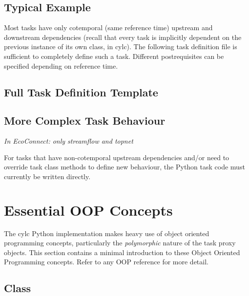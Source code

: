 \documentclass[11pt,a4paper]{article}
\begin{document}
\subsection{Typical Example}

Most tasks have only cotemporal (same reference time) upstream and
downstream dependencies (recall that every task is implicitly dependent
on the previous instance of its own class, in cylc). The following
task definition file is sufficient to completely define such a task.
Different postrequisites can be specified depending on reference time. 

\lstset{language=bash, numbers=left}

{
\color{Magenta}

}

\subsection{Full Task Definition Template}

\lstset{language=sh, numbers=left}

{
\color{Magenta}

}

\subsection{More Complex Task Behaviour}

\textit{In EcoConnect: only streamflow and topnet}

For tasks that have non-cotemporal upstream dependencies and/or need to  
override task class methods to define new behaviour, the Python task
code must currently be written directly. 



\appendix

\section{Essential OOP Concepts}

The cylc Python implementation makes heavy use of object oriented
programming concepts, particularly the {\em polymorphic} nature of
the task proxy objects.  This section contains a minimal introduction
to these Object Oriented Programming concepts.  Refer to any OOP
reference for more detail.

\subsection{Class}
\end{document}
